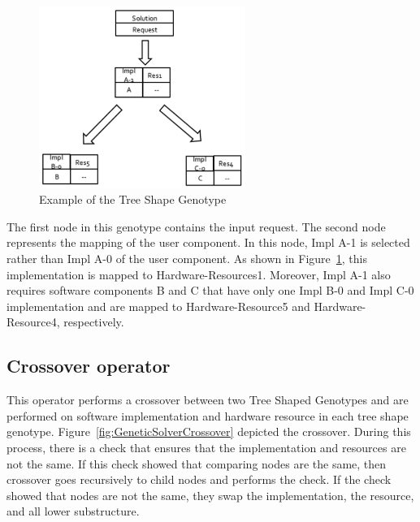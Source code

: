 \begin{figure}
	\centering
	\includegraphics[width=0.6\textwidth]{images/TreeShapeGenotypeExample.png}
	\caption[Example of the Tree Shape Genotype]{Example of the Tree Shape Genotype}
	\label{fig:TreeShapeGenotypeExample}
\end{figure}

The first node in this genotype contains the input request. The second node represents the mapping of the user component. In this node, Impl A-1 is selected rather than Impl A-0 of the user component. As shown in Figure~\ref{fig:TreeShapeGenotypeExample}, this implementation is mapped to Hardware-Resources1. Moreover, Impl A-1 also requires software components B and C that have only one Impl B-0 and Impl C-0 implementation and are mapped to Hardware-Resource5 and Hardware-Resource4, respectively.

\subsection{Crossover operator}

This operator performs a crossover between two Tree Shaped Genotypes and are performed on software implementation and hardware resource in each tree shape genotype. Figure~\ref{fig:GeneticSolverCrossover} depicted the crossover. 
During this process, there is a check that ensures that the implementation and resources are not the same. If this check showed that comparing nodes are the same, then crossover goes recursively to child nodes and performs the check.
If the check showed that nodes are not the same, they swap the implementation, the resource, and all lower substructure.

